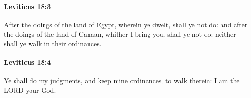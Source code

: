 		\paragraph{Leviticus 18:3} %
			\label{LEVITICUS-18-3}

			After the doings of the land of Egypt, wherein ye dwelt, shall ye not do: and after the doings of the land of Canaan, whither I bring you, shall ye not do: neither shall ye walk in their ordinances.


		\paragraph{Leviticus 18:4} %
			\label{LEVITICUS-18-4}

			Ye shall do my judgments, and keep mine ordinances, to walk therein: I am the LORD your God.



